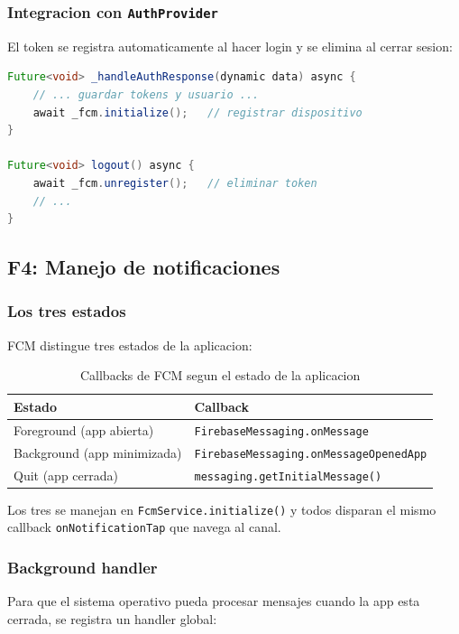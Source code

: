 \subsubsection{Integracion con \texttt{AuthProvider}}

El token se registra automaticamente al hacer login y se elimina al cerrar sesion:

\begin{lstlisting}[language=Java]
Future<void> _handleAuthResponse(dynamic data) async {
    // ... guardar tokens y usuario ...
    await _fcm.initialize();   // registrar dispositivo
}

Future<void> logout() async {
    await _fcm.unregister();   // eliminar token
    // ...
}
\end{lstlisting}

\subsection{F4: Manejo de notificaciones}

\subsubsection{Los tres estados}

FCM distingue tres estados de la aplicacion:

\begin{table}[htbp]
\centering
\begin{tabular}{l l}
\toprule
Estado & Callback \\
\midrule
Foreground (app abierta) & \texttt{FirebaseMessaging.onMessage} \\
Background (app minimizada) & \texttt{FirebaseMessaging.onMessageOpenedApp} \\
Quit (app cerrada) & \texttt{messaging.getInitialMessage()} \\
\bottomrule
\end{tabular}
\caption{Callbacks de FCM segun el estado de la aplicacion}
\end{table}

Los tres se manejan en \texttt{FcmService.initialize()} y todos disparan el mismo callback \texttt{onNotificationTap} que navega al canal.

\subsubsection{Background handler}

Para que el sistema operativo pueda procesar mensajes cuando la app esta cerrada, se registra un handler global:

